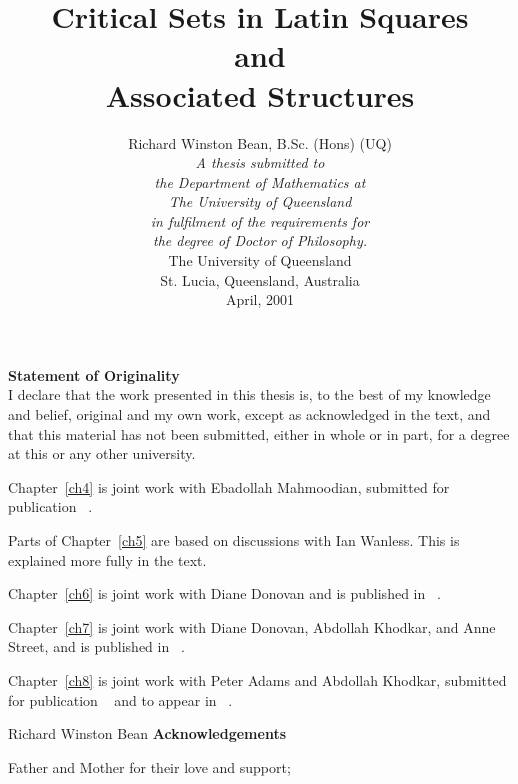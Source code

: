 \documentclass[12pt]{report}
\begin{document}
\title{{\bf Critical Sets in Latin Squares\\
        and\\
        Associated Structures}} 
\author{ Richard Winston Bean, B.Sc. (Hons) (UQ) \\[1.0cm]
 {\em A thesis submitted to}\\
 {\em the Department of Mathematics at}\\
 {\em The University of Queensland} \\
 {\em in fulfilment of the requirements for}\\
 {\em the degree of Doctor of Philosophy.}
\vspace{20mm}\\
The University of Queensland  \\
St. Lucia, Queensland, Australia
\vspace{8mm}\\
April, 2001}
\date{}
\maketitle

{\bf {\huge Statement of Originality}} \\

I declare that the work presented in this thesis is, to the best of my
knowledge and belief, original and my own work, except as acknowledged
in the text, and that this material has not been submitted, either in
whole or in part, for a degree at this or any other university.

Chapter~\ref{ch4} is joint work with Ebadollah Mahmoodian, submitted for publication
~\cite{me3}.

Parts of Chapter~\ref{ch5} are based on discussions with Ian Wanless.  This is
explained more fully in the text.

Chapter~\ref{ch6} is joint work with Diane Donovan and is published
in ~\cite{me1}.  

Chapter~\ref{ch7} is joint work with Diane Donovan, Abdollah Khodkar, and Anne
Street, and is published in ~\cite{me2}.

Chapter~\ref{ch8} is joint work with Peter Adams and Abdollah Khodkar, submitted for publication ~\cite{abk} and to appear in ~\cite{disj}.

\vskip 50mm

Richard Winston Bean
\newpage
{\bf {\huge Acknowledgements}}

Father and Mother for their love and support;
\end{document}

